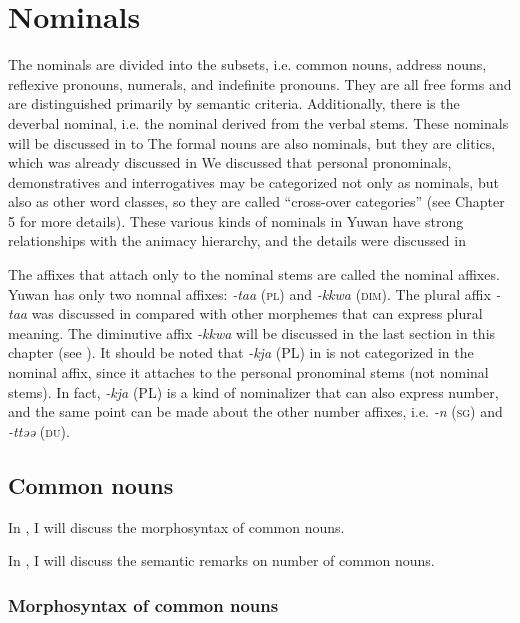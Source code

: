 \chapter{Nominals}\label{chap:7}

The nominals are divided into the subsets, i.e. common nouns, address nouns, reflexive pronouns, numerals, and indefinite pronouns. They are all free forms and are distinguished primarily by semantic criteria. Additionally, there is the deverbal nominal, i.e. the nominal derived from the verbal stems. These nominals will be discussed in  to  The formal nouns are also nominals, but they are clitics, which was already discussed in  We discussed that personal pronominals, demonstratives and interrogatives may be categorized not only as nominals, but also as other word classes, so they are called “cross-over categories” (see Chapter 5 for more details). These various kinds of nominals in Yuwan have strong relationships with the animacy hierarchy, and the details were discussed in 

The affixes that attach only to the nominal stems are called the nominal affixes. Yuwan has only two nomnal affixes: \textit{{}-taa} (\textsc{pl}) and \textit{{}-kkwa} (\textsc{dim}). The plural affix \textit{{}-taa} was discussed in  compared with other morphemes that can express plural meaning. The diminutive affix \textit{{}-kkwa} will be discussed in the last section in this chapter (see ). It should be noted that \textit{{}-kja} (PL) in  is not categorized in the nominal affix, since it attaches to the personal pronominal stems (not nominal stems). In fact, \textit{{}-kja} (PL) is a kind of nominalizer that can also express number, and the same point can be made about the other number affixes, i.e. \textit{{}-n} (\textsc{sg}) and \textit{{}-ttəə} (\textsc{du}).

\section{Common nouns}

In , I will discuss the morphosyntax of common nouns.

In , I will discuss the semantic remarks on number of common nouns.

\subsection{Morphosyntax of common nouns}

